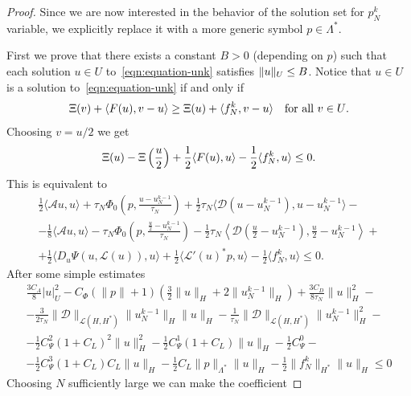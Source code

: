 \documentclass[a4paper,10pt,twoside]{amsbook}
\numberwithin{section}{chapter}
\numberwithin{equation}{chapter}
\theoremstyle{definition}
\DeclarePairedDelimiter{\norm}{\lVert}{\rVert}
\DeclarePairedDelimiter{\dual}{\langle}{\rangle}
\begin{document}
\begin{proof}
Since we are now interested in the behavior of the solution set for $p_N^k$ variable, we explicitly replace it with a more generic symbol $p\in\Lambda^*$.

First we prove that there exists a constant $B>0$ (depending on $p$) such that each solution $u\in U$ to~\eqref{eqn:equation-unk} satisfies $\norm{u}_U\le B$. Notice that $u\in U$ is a solution to~\eqref{eqn:equation-unk} if and only if
\begin{equation}
\label{eqn:equation-unk-explicit}
\Xi(v)+\dual{F(u),v-u}\ge\Xi(u)+\dual{f_N^k,v-u}\quad\text{for all $v\in U$}.
\end{equation}
Choosing $v=u/2$ we get
\[
\Xi(u)-\Xi\left(\frac{u}{2}\right)+\frac{1}{2}\dual{F(u),u}-\frac{1}{2}\dual{f_N^k,u}\le0.
\]
This is equivalent to
\begin{equation}
\begin{multlined}
\frac{1}{2}\langle \mathcal{A}u,u\rangle+\tau_N\Phi_0\left(p,\frac{u-u_N^{k-1}}{\tau_N}\right)+\frac{1}{2}\tau_N\langle\mathcal{D}(u-u_N^{k-1}),u-u_N^{k-1}\rangle-\\
-\frac{1}{8}\langle \mathcal{A}u,u\rangle-\tau_N\Phi_0\left(p,\frac{\frac{u}{2}-u_N^{k-1}}{\tau_N}\right)-\frac{1}{2}\tau_N\left\langle \mathcal{D}\left(\frac{u}{2}-u_N^{k-1}\right),\frac{u}{2}-u_N^{k-1}\right\rangle+\\
+\frac{1}{2}\langle D_u\Psi(u,\mathcal{L}(u)),u\rangle+\frac{1}{2}\langle\mathcal{L}'(u)^*p,u\rangle-\frac{1}{2}\langle f_N^k,u\rangle\le0.
\end{multlined} 
\end{equation}
After some simple estimates
\begin{equation}
\label{eqn:boundedness}
\begin{multlined}
\frac{3C_A}{8}|u|_U^2-C_{\Phi}(\|p\|+1)\left(\frac{3}{2}\|u\|_H+2\|u_N^{k-1}\|_H\right)+\frac{3C_D}{8\tau_N}\|u\|_H^2-\\
-\frac{3}{2\tau_N}\|\mathcal{D}\|_{\mathscr{L}(H,H^*)}\|u_N^{k-1}\|_H\|u\|_H-\frac{1}{\tau_N}\|\mathcal{D}\|_{\mathscr{L}(H,H^*)}\|u_N^{k-1}\|_H^2-\\
-\frac{1}{2}C_{\Psi}^2(1+C_L)^2\|u\|_H^2-\frac{1}{2}C_{\Psi}^1(1+C_L)\|u\|_H-\frac{1}{2}C_{\Psi}^0-\\
-\frac{1}{2}C_{\Psi}^3(1+C_L)C_L\|u\|_H-\frac{1}{2}C_L\|p\|_{\Lambda^*}\|u\|_H-\frac{1}{2}\|f_N^k\|_{H^*}\|u\|_H\le0
\end{multlined}
\end{equation}
Choosing $N$ sufficiently large we can make the coefficient

\end{proof}
\end{document}
